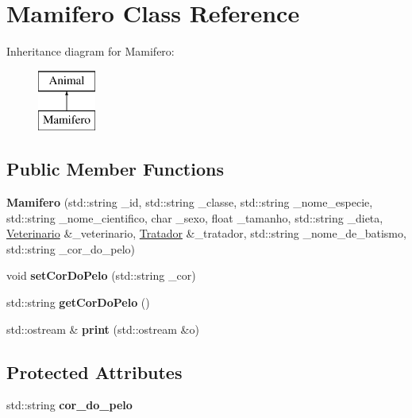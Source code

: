 \hypertarget{classMamifero}{}\section{Mamifero Class Reference}
\label{classMamifero}
Inheritance diagram for Mamifero\+:\begin{figure}[H]
\begin{center}
\leavevmode
\includegraphics[height=2.000000cm]{classMamifero}
\end{center}
\end{figure}
\subsection*{Public Member Functions}
\begin{DoxyCompactItemize}
\item 
\mbox{\label{classMamifero_a98c09018dcc79051f2a187d12e408a72}} 
{\bfseries Mamifero} (std\+::string \+\_\+id, std\+::string \+\_\+classe, std\+::string \+\_\+nome\+\_\+especie, std\+::string \+\_\+nome\+\_\+cientifico, char \+\_\+sexo, float \+\_\+tamanho, std\+::string \+\_\+dieta, \hyperlink{classVeterinario}{Veterinario} \&\+\_\+veterinario, \hyperlink{classTratador}{Tratador} \&\+\_\+tratador, std\+::string \+\_\+nome\+\_\+de\+\_\+batismo, std\+::string \+\_\+cor\+\_\+do\+\_\+pelo)
\item 
\mbox{\label{classMamifero_ae7d1d9b7925e06c6fa34074a2654ff30}} 
void {\bfseries set\+Cor\+Do\+Pelo} (std\+::string \+\_\+cor)
\item 
\mbox{\label{classMamifero_a7bf7c25d72549218df4472922ed365de}} 
std\+::string {\bfseries get\+Cor\+Do\+Pelo} ()
\item 
\mbox{\label{classMamifero_ae346f07cf380af1fc63f3fb4d88597d1}} 
std\+::ostream \& {\bfseries print} (std\+::ostream \&o)
\end{DoxyCompactItemize}
\subsection*{Protected Attributes}
\begin{DoxyCompactItemize}
\item 
\mbox{\label{classMamifero_a0fa2c0b3d670dbb657e6c5f112039327}} 
std\+::string {\bfseries cor\+\_\+do\+\_\+pelo}
\end{DoxyCompactItemize}


